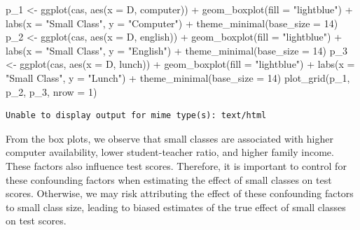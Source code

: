\documentclass[
  12pt,
  a4paper,
]{scrbook}
\newenvironment{Shaded}{\begin{snugshade}}{\end{snugshade}}
\newcommand{\AttributeTok}[1]{\textcolor[rgb]{0.40,0.45,0.13}{#1}}
\newcommand{\DecValTok}[1]{\textcolor[rgb]{0.68,0.00,0.00}{#1}}
\newcommand{\FunctionTok}[1]{\textcolor[rgb]{0.28,0.35,0.67}{#1}}
\newcommand{\NormalTok}[1]{\textcolor[rgb]{0.00,0.23,0.31}{#1}}
\newcommand{\OtherTok}[1]{\textcolor[rgb]{0.00,0.23,0.31}{#1}}
\newcommand{\SpecialCharTok}[1]{\textcolor[rgb]{0.37,0.37,0.37}{#1}}
\newcommand{\StringTok}[1]{\textcolor[rgb]{0.13,0.47,0.30}{#1}}
\theoremstyle{plain}
\theoremstyle{definition}
\theoremstyle{remark}
\begin{document}
\begin{Shaded}
\begin{Highlighting}[]
\NormalTok{p\_1 }\OtherTok{\textless{}{-}} \FunctionTok{ggplot}\NormalTok{(cas, }\FunctionTok{aes}\NormalTok{(}\AttributeTok{x =}\NormalTok{ D, computer)) }\SpecialCharTok{+}
  \FunctionTok{geom\_boxplot}\NormalTok{(}\AttributeTok{fill =} \StringTok{"lightblue"}\NormalTok{) }\SpecialCharTok{+}
  \FunctionTok{labs}\NormalTok{(}\AttributeTok{x =} \StringTok{"Small Class"}\NormalTok{, }\AttributeTok{y =} \StringTok{"Computer"}\NormalTok{) }\SpecialCharTok{+}
  \FunctionTok{theme\_minimal}\NormalTok{(}\AttributeTok{base\_size =} \DecValTok{14}\NormalTok{)}
\NormalTok{p\_2 }\OtherTok{\textless{}{-}} \FunctionTok{ggplot}\NormalTok{(cas, }\FunctionTok{aes}\NormalTok{(}\AttributeTok{x =}\NormalTok{ D, english)) }\SpecialCharTok{+}
  \FunctionTok{geom\_boxplot}\NormalTok{(}\AttributeTok{fill =} \StringTok{"lightblue"}\NormalTok{) }\SpecialCharTok{+}
  \FunctionTok{labs}\NormalTok{(}\AttributeTok{x =} \StringTok{"Small Class"}\NormalTok{, }\AttributeTok{y =} \StringTok{"English"}\NormalTok{) }\SpecialCharTok{+}
  \FunctionTok{theme\_minimal}\NormalTok{(}\AttributeTok{base\_size =} \DecValTok{14}\NormalTok{)}
\NormalTok{p\_3 }\OtherTok{\textless{}{-}} \FunctionTok{ggplot}\NormalTok{(cas, }\FunctionTok{aes}\NormalTok{(}\AttributeTok{x =}\NormalTok{ D, lunch)) }\SpecialCharTok{+}
  \FunctionTok{geom\_boxplot}\NormalTok{(}\AttributeTok{fill =} \StringTok{"lightblue"}\NormalTok{) }\SpecialCharTok{+}
  \FunctionTok{labs}\NormalTok{(}\AttributeTok{x =} \StringTok{"Small Class"}\NormalTok{, }\AttributeTok{y =} \StringTok{"Lunch"}\NormalTok{) }\SpecialCharTok{+}
  \FunctionTok{theme\_minimal}\NormalTok{(}\AttributeTok{base\_size =} \DecValTok{14}\NormalTok{)}
\FunctionTok{plot\_grid}\NormalTok{(p\_1, p\_2, p\_3, }\AttributeTok{nrow =} \DecValTok{1}\NormalTok{)}
\end{Highlighting}
\end{Shaded}

\begin{verbatim}
Unable to display output for mime type(s): text/html
\end{verbatim}

From the box plots, we observe that small classes are associated with
higher computer availability, lower student-teacher ratio, and higher
family income. These factors also influence test scores. Therefore, it
is important to control for these confounding factors when estimating
the effect of small classes on test scores. Otherwise, we may risk
attributing the effect of these confounding factors to small class size,
leading to biased estimates of the true effect of small classes on test
scores.
\end{document}
